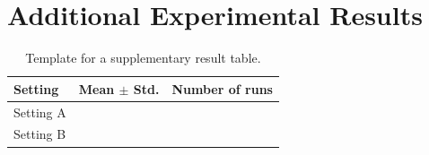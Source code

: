 \section{Additional Experimental Results}
\label{app:additional-results}


\begin{table}[H]
  \centering
  \caption{Template for a supplementary result table.}
  \label{tab:supplementary-results}
  \begin{tabular}{lcc}
    \toprule
    Setting & Mean $\pm$ Std. & Number of runs \\
    \midrule
    Setting A & \placeholder{--} & \placeholder{--} \\
    Setting B & \placeholder{--} & \placeholder{--} \\
    \bottomrule
  \end{tabular}
\end{table}
